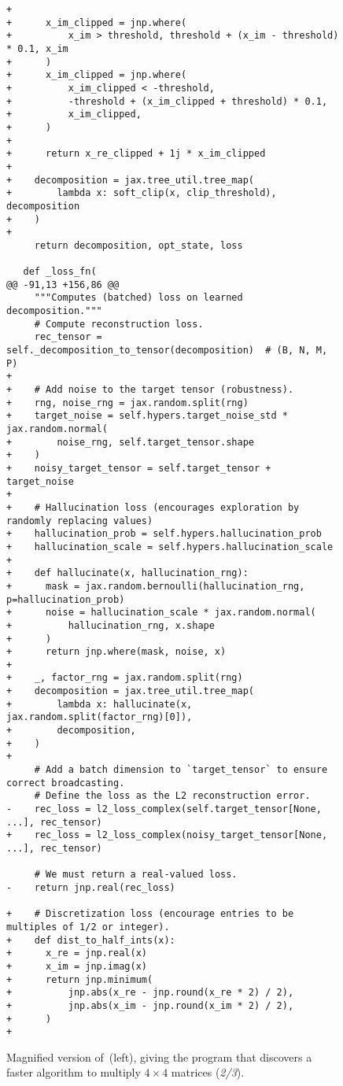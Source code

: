 \begin{figure}[p]
\renewcommand{\thefigure}{\arabic{figure}b}\vspace{-0.03\textwidth}
\begin{adjustbox}{width=0.9\textwidth}
\begin{minipage}{0.9\textwidth}
\begin{lstlisting}[style=pydiff, backgroundcolor=\color{backcolour}, firstnumber=66]
+
+      x_im_clipped = jnp.where(
+          x_im > threshold, threshold + (x_im - threshold) * 0.1, x_im
+      )
+      x_im_clipped = jnp.where(
+          x_im_clipped < -threshold,
+          -threshold + (x_im_clipped + threshold) * 0.1,
+          x_im_clipped,
+      )
+
+      return x_re_clipped + 1j * x_im_clipped
+
+    decomposition = jax.tree_util.tree_map(
+        lambda x: soft_clip(x, clip_threshold), decomposition
+    )
+
     return decomposition, opt_state, loss
 
   def _loss_fn(
@@ -91,13 +156,86 @@
     """Computes (batched) loss on learned decomposition."""
     # Compute reconstruction loss.
     rec_tensor = self._decomposition_to_tensor(decomposition)  # (B, N, M, P)
+
+    # Add noise to the target tensor (robustness).
+    rng, noise_rng = jax.random.split(rng)
+    target_noise = self.hypers.target_noise_std * jax.random.normal(
+        noise_rng, self.target_tensor.shape
+    )
+    noisy_target_tensor = self.target_tensor + target_noise
+
+    # Hallucination loss (encourages exploration by randomly replacing values)
+    hallucination_prob = self.hypers.hallucination_prob
+    hallucination_scale = self.hypers.hallucination_scale
+
+    def hallucinate(x, hallucination_rng):
+      mask = jax.random.bernoulli(hallucination_rng, p=hallucination_prob)
+      noise = hallucination_scale * jax.random.normal(
+          hallucination_rng, x.shape
+      )
+      return jnp.where(mask, noise, x)
+
+    _, factor_rng = jax.random.split(rng)
+    decomposition = jax.tree_util.tree_map(
+        lambda x: hallucinate(x, jax.random.split(factor_rng)[0]),
+        decomposition,
+    )
+
     # Add a batch dimension to `target_tensor` to ensure correct broadcasting.
     # Define the loss as the L2 reconstruction error.
-    rec_loss = l2_loss_complex(self.target_tensor[None, ...], rec_tensor)
+    rec_loss = l2_loss_complex(noisy_target_tensor[None, ...], rec_tensor)
 
     # We must return a real-valued loss.
-    return jnp.real(rec_loss)
 
+    # Discretization loss (encourage entries to be multiples of 1/2 or integer).
+    def dist_to_half_ints(x):
+      x_re = jnp.real(x)
+      x_im = jnp.imag(x)
+      return jnp.minimum(
+          jnp.abs(x_re - jnp.round(x_re * 2) / 2),
+          jnp.abs(x_im - jnp.round(x_im * 2) / 2),
+      )
+
\end{lstlisting}
\end{minipage}
\end{adjustbox}
\caption{Magnified version of~(left), giving the program that discovers a faster algorithm to multiply $4\times4$ matrices  (\emph{2/3}).}\label{fig:relaxed-opt-diff-appendix-2}
\centering
\end{figure}
\addtocounter{figure}{-1}


